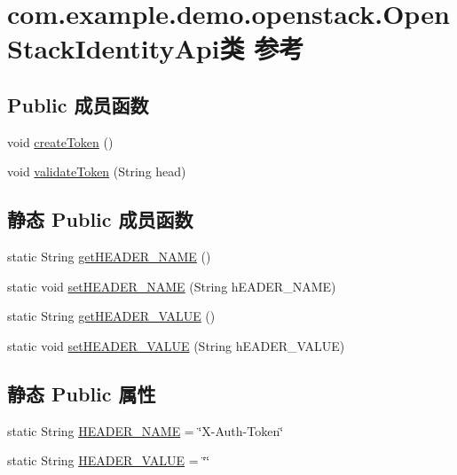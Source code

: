 \hypertarget{classcom_1_1example_1_1demo_1_1openstack_1_1_open_stack_identity_api}{}\section{com.\+example.\+demo.\+openstack.\+Open\+Stack\+Identity\+Api类 参考}
\label{classcom_1_1example_1_1demo_1_1openstack_1_1_open_stack_identity_api}
\subsection*{Public 成员函数}
\begin{DoxyCompactItemize}
\item 
void \mbox{\hyperlink{classcom_1_1example_1_1demo_1_1openstack_1_1_open_stack_identity_api_a6b11a2ca8d75bca2def8435054d9c301}{create\+Token}} ()
\item 
void \mbox{\hyperlink{classcom_1_1example_1_1demo_1_1openstack_1_1_open_stack_identity_api_ad6b24aa89347255e2ef14645c06fa235}{validate\+Token}} (String head)
\end{DoxyCompactItemize}
\subsection*{静态 Public 成员函数}
\begin{DoxyCompactItemize}
\item 
static String \mbox{\hyperlink{classcom_1_1example_1_1demo_1_1openstack_1_1_open_stack_identity_api_a6ac4abdfb59239d67e9d7cd41b60ab9c}{get\+H\+E\+A\+D\+E\+R\+\_\+\+N\+A\+ME}} ()
\item 
static void \mbox{\hyperlink{classcom_1_1example_1_1demo_1_1openstack_1_1_open_stack_identity_api_aaa4211a17762daee7e8506d7764e1636}{set\+H\+E\+A\+D\+E\+R\+\_\+\+N\+A\+ME}} (String h\+E\+A\+D\+E\+R\+\_\+\+N\+A\+ME)
\item 
static String \mbox{\hyperlink{classcom_1_1example_1_1demo_1_1openstack_1_1_open_stack_identity_api_a6ea5b9ebdaaf0582a77c9c47a7374c68}{get\+H\+E\+A\+D\+E\+R\+\_\+\+V\+A\+L\+UE}} ()
\item 
static void \mbox{\hyperlink{classcom_1_1example_1_1demo_1_1openstack_1_1_open_stack_identity_api_a03a0a98fa923b8269fdef59613b4d72a}{set\+H\+E\+A\+D\+E\+R\+\_\+\+V\+A\+L\+UE}} (String h\+E\+A\+D\+E\+R\+\_\+\+V\+A\+L\+UE)
\end{DoxyCompactItemize}
\subsection*{静态 Public 属性}
\begin{DoxyCompactItemize}
\item 
static String \mbox{\hyperlink{classcom_1_1example_1_1demo_1_1openstack_1_1_open_stack_identity_api_abbee46dce4c997f2629a0dd848fdef57}{H\+E\+A\+D\+E\+R\+\_\+\+N\+A\+ME}} = \char`\"{}X-\/Auth-\/Token\char`\"{}
\item 
static String \mbox{\hyperlink{classcom_1_1example_1_1demo_1_1openstack_1_1_open_stack_identity_api_a21b22f9929fe4694ef5d642087a52cdf}{H\+E\+A\+D\+E\+R\+\_\+\+V\+A\+L\+UE}} = \char`\"{}\char`\"{}
\end{DoxyCompactItemize}
